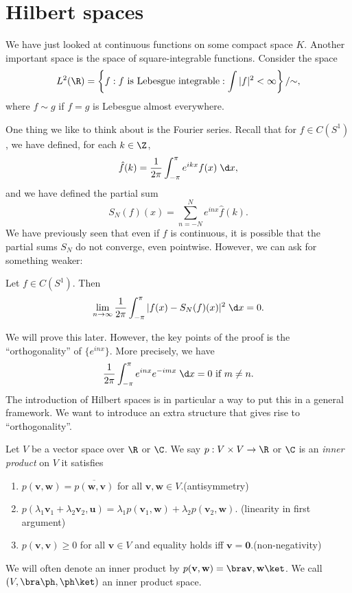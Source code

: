 \documentclass[a4paper]{article}
\begin{document}
\section{Hilbert spaces}
We have just looked at continuous functions on some compact space $K$. Another important space is the space of square-integrable functions. Consider the space
\[
  L^2(\R) = \left\{f: f\text{ is Lebesgue integrable} : \int |f|^2 < \infty\right\} / {\sim},
\]
where $f \sim g$ if $f = g$ is Lebesgue almost everywhere.

One thing we like to think about is the Fourier series. Recall that for $f \in C(S^1)$, we have defined, for each $k \in \Z$,
\[
  \hat{f}(k) = \frac{1}{2\pi} \int_{-\pi}^\pi e^{ikx}f(x)\;\d x,
\]
and we have defined the partial sum
\[
  S_N(f)(x) = \sum_{n = -N}^N e^{inx} \hat{f}(k).
\]
We have previously seen that even if $f$ is continuous, it is possible that the partial sums $S_N$ do not converge, even pointwise. However, we can ask for something weaker:

\begin{prop}
  Let $f \in C(S^1)$. Then
  \[
    \lim_{n \to \infty} \frac{1}{2\pi}\int_{-\pi}^\pi |f(x) - S_N(f)(x)|^2 \;\d x = 0.
  \]
\end{prop}
We will prove this later. However, the key points of the proof is the ``orthogonality'' of $\{e^{inx}\}$. More precisely, we have
\[
  \frac{1}{2\pi} \int_{-\pi}^\pi e^{inx}e^{-imx} \;\d x = 0\text{ if } m\not= n.
\]
The introduction of Hilbert spaces is in particular a way to put this in a general framework. We want to introduce an extra structure that gives rise to ``orthogonality''.

\begin{defi}
  Let $V$ be a vector space over $\R$ or $\C$. We say $p: V \times V \to \R$ or $\C$ is an \emph{inner product} on $V$ it satisfies
  \begin{enumerate}
    \item $p(\mathbf{v}, \mathbf{w}) = \overline{p(\mathbf{w}, \mathbf{v})}$ for all $\mathbf{v}, \mathbf{w} \in V$.\hfill(antisymmetry)
    \item $p(\lambda_1 \mathbf{v}_1 + \lambda_2 \mathbf{v}_2, \mathbf{u}) = \lambda_1 p(\mathbf{v}_1, \mathbf{w}) + \lambda_2 p(\mathbf{v}_2, \mathbf{w})$. \hfill(linearity in first argument)
    \item $p(\mathbf{v}, \mathbf{v}) \geq 0$ for all $\mathbf{v} \in V$ and equality holds iff $\mathbf{v} = \mathbf{0}$.\hfill(non-negativity)
  \end{enumerate}
  We will often denote an inner product by $p(\mathbf{v}, \mathbf{w}) = \bra \mathbf{v}, \mathbf{w}\ket$. We call $(V, \bra\ph ,\ph \ket)$ an inner product space.
\end{defi}
\end{document}
